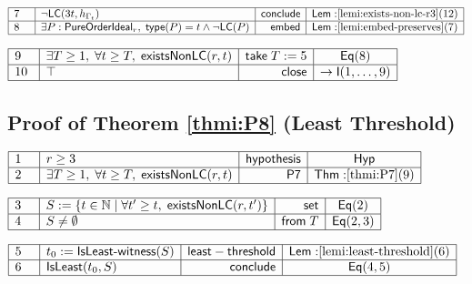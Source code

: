 \documentclass[11pt,reqno]{amsart}
\providecommand{\N}{\mathbb{N}}
\begin{document}
\nointerlineskip\noindent$%
\begin{array}{|m{0.5cm}|l|r|c|}
\hline
7 & \neg\mathsf{LC}(3t,h_{\Gamma_{t}}) & \mathsf{conclude} & \mathsf{Lem:}%
\ref{lemi:exists-non-lc-r3}(12) \\ \hline
8 & \exists P:\mathsf{PureOrderIdeal}_{r},\;\mathsf{type}(P)=t\wedge\neg%
\mathsf{LC}(P) & \mathsf{embed} & \mathsf{Lem:}\ref{lemi:embed-preserves}(7)
\\ \hline
\end{array}%
$

\nointerlineskip\noindent$%
\begin{array}{|m{0.5cm}|l|r|c|}
\hline
9 & \exists T\ge1,\;\forall t\ge T,\;\mathsf{existsNonLC}(r,t) & \mathsf{take%
}\;T:=5 & \mathsf{Eq}(8) \\ \hline
10 & \top & \mathsf{close} & \to\mathsf{I}(1,\dots,9) \\ \hline
\end{array}%
$

\medskip

\subsection*{Proof of Theorem \protect\ref{thmi:P8} (Least Threshold)}

\noindent $%
\begin{array}{|m{0.5cm}|l|r|c|}
\hline
1 & r\geq 3 & \mathsf{hypothesis} & \mathsf{Hyp} \\ \hline
2 & \exists T\geq 1,\;\forall t\geq T,\;\mathsf{existsNonLC}(r,t) & \mathsf{%
P7} & \mathsf{Thm:}\ref{thmi:P7}(9) \\ \hline
\end{array}%
$

\nointerlineskip\noindent$%
\begin{array}{|m{0.5cm}|l|r|c|}
\hline
3 & S:=\{t\in\N\mid\forall t^{\prime}\ge t,\;\mathsf{existsNonLC}%
(r,t^{\prime})\} & \mathsf{set} & \mathsf{Eq}(2) \\ \hline
4 & S\ne\emptyset & \mathsf{from}\;T & \mathsf{Eq}(2,3) \\ \hline
\end{array}%
$

\nointerlineskip\noindent$%
\begin{array}{|m{0.5cm}|l|r|c|}
\hline
5 & t_{0}:=\mathsf{IsLeast\text{-}witness}(S) & \mathsf{least-threshold} & 
\mathsf{Lem:}\ref{lemi:least-threshold}(6) \\ \hline
6 & \mathsf{IsLeast}(t_{0},S) & \mathsf{conclude} & \mathsf{Eq}(4,5) \\ 
\hline
\end{array}%
$
\end{document}
